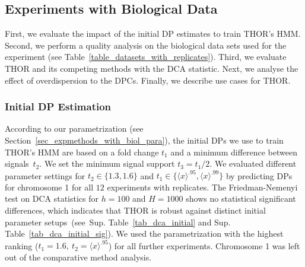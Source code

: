 \subsection{Experiments with Biological Data}
First, we evaluate the impact of the initial DP estimates to train THOR's HMM. 
Second, we perform a quality analysis on the biological data sets used for the experiment (see Table~\ref{table_datasets_with_replicates}). 
Third, we evaluate THOR and its competing methods with the DCA statistic.
Next, we analyse the effect of overdispersion to the DPCs.
Finally, we describe use cases for THOR.


\subsubsection{Initial DP Estimation}
According to our parametrization (see Section~\ref{sec_expmethods_with_biol_para}), the initial DPs we use to train THOR's HMM are based on a fold change $t_1$ and a minimum difference between signals~$t_2$.
We set the minimum signal support $t_3=t_1/2$.
We evaluated different parameter settings for $t_2 \in \{1.3, 1.6\}$ and $t_1 \in \big\{\langle x \rangle^{.95}, \langle x \rangle^{.99}\big\}$ by predicting DPs for chromosome 1 for all $12$ experiments with replicates. 
The Friedman-Nemenyi test on DCA statistics for $h = 100 $ and $H = 1000$ shows no statistical significant differences, which indicates that THOR is robust against distinct initial parameter setups~(see~Sup. Table~\ref{tab_dca_initial} and Sup. Table~\ref{tab_dca_initial_sig}). 
We used the parametrization with the highest ranking ($t_1 = 1.6,\ t_2 = \langle x \rangle^{.95}$) for all further experiments. 
Chromosome 1 was left out of the comparative method analysis. 

